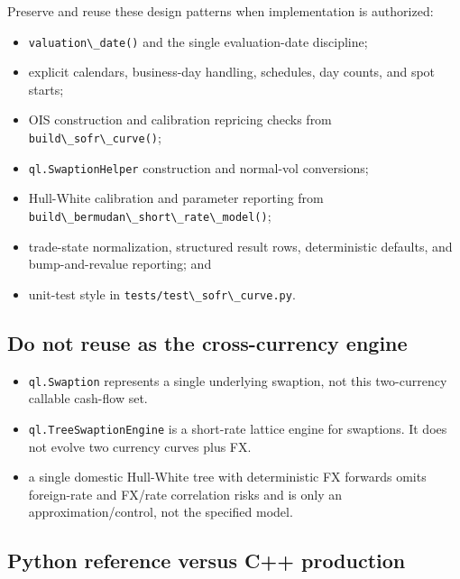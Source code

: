 \documentclass[conference]{IEEEtran}
\newcommand{\passthrough}[1]{#1}
\providecommand{\tightlist}{}
\begin{document}
Preserve and reuse these design patterns when implementation is
authorized:

\begin{itemize}
\tightlist
\item
  \passthrough{\lstinline!valuation\_date()!} and the single
  evaluation-date discipline;
\item
  explicit calendars, business-day handling, schedules, day counts, and
  spot starts;
\item
  OIS construction and calibration repricing checks from
  \passthrough{\lstinline!build\_sofr\_curve()!};
\item
  \passthrough{\lstinline!ql.SwaptionHelper!} construction and
  normal-vol conversions;
\item
  Hull-White calibration and parameter reporting from
  \passthrough{\lstinline!build\_bermudan\_short\_rate\_model()!};
\item
  trade-state normalization, structured result rows, deterministic
  defaults, and bump-and-revalue reporting; and
\item
  unit-test style in
  \passthrough{\lstinline!tests/test\_sofr\_curve.py!}.
\end{itemize}

\subsection{Do not reuse as the cross-currency
engine}\label{92-do-not-reuse-as-the-cross-currency-engine}

\begin{itemize}
\tightlist
\item
  \passthrough{\lstinline!ql.Swaption!} represents a single underlying
  swaption, not this two-currency callable cash-flow set.
\item
  \passthrough{\lstinline!ql.TreeSwaptionEngine!} is a short-rate
  lattice engine for swaptions. It does not evolve two currency curves
  plus FX.
\item
  a single domestic Hull-White tree with deterministic FX forwards omits
  foreign-rate and FX/rate correlation risks and is only an
  approximation/control, not the specified model.
\end{itemize}

\subsection{Python reference versus C++
production}\label{93-python-reference-versus-c-production}
\end{document}
